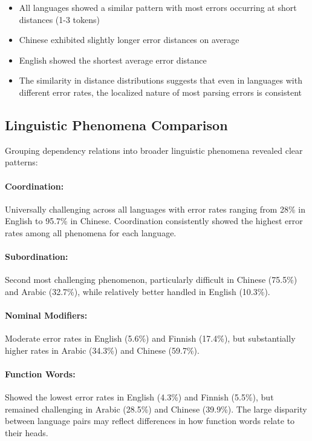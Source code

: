 \documentclass[11pt]{article}
\begin{document}
\begin{itemize}
    \item All languages showed a similar pattern with most errors occurring at short distances (1-3 tokens)
    \item Chinese exhibited slightly longer error distances on average
    \item English showed the shortest average error distance
    \item The similarity in distance distributions suggests that even in languages with different error rates, the localized nature of most parsing errors is consistent
\end{itemize}

\subsection{Linguistic Phenomena Comparison}

Grouping dependency relations into broader linguistic phenomena revealed clear patterns:

\paragraph{Coordination:} Universally challenging across all languages with error rates ranging from 28\% in English to 95.7\% in Chinese. Coordination consistently showed the highest error rates among all phenomena for each language.

\paragraph{Subordination:} Second most challenging phenomenon, particularly difficult in Chinese (75.5\%) and Arabic (32.7\%), while relatively better handled in English (10.3\%).

\paragraph{Nominal Modifiers:} Moderate error rates in English (5.6\%) and Finnish (17.4\%), but substantially higher rates in Arabic (34.3\%) and Chinese (59.7\%).

\paragraph{Function Words:} Showed the lowest error rates in English (4.3\%) and Finnish (5.5\%), but remained challenging in Arabic (28.5\%) and Chinese (39.9\%). The large disparity between language pairs may reflect differences in how function words relate to their heads.
\end{document}
